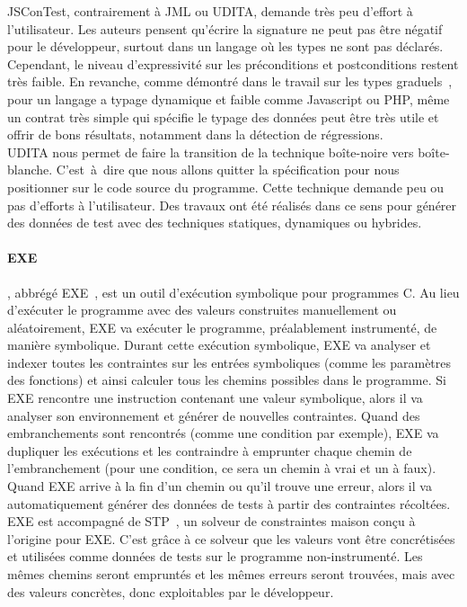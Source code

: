 JSConTest, contrairement à JML ou UDITA, demande très peu d'effort à
l'utilisateur. Les auteurs pensent qu'écrire la signature ne peut pas être
négatif pour le développeur, surtout dans un langage où les types ne sont pas
déclarés. Cependant, le niveau d'expressivité sur les préconditions et
postconditions restent très faible. En revanche, comme démontré dans le travail
sur les types graduels~, pour un langage a typage dynamique et
faible comme Javascript ou PHP, même un contrat très simple qui spécifie le
typage des données peut être très utile et offrir de bons résultats, notamment
dans la détection de régressions. \\

UDITA nous permet de faire la transition de la technique boîte-noire vers
boîte-blanche. C'est~à~dire que nous allons quitter la spécification pour nous
positionner sur le code source du programme. Cette technique demande peu ou pas
d'efforts à l'utilisateur. Des travaux ont été réalisés dans ce sens pour
générer des données de test avec des techniques statiques, dynamiques ou
hybrides.

\paragraph{EXE} , abbrégé
EXE~, est un outil d'exécution symbolique pour
programmes C.  Au lieu d'exécuter le programme avec des valeurs construites
manuellement ou aléatoirement, EXE va exécuter le programme, préalablement
instrumenté, de manière symbolique. Durant cette exécution symbolique, EXE va
analyser et indexer toutes les contraintes sur les entrées symboliques (comme
les paramètres des fonctions) et ainsi calculer tous les chemins possibles dans
le programme.  Si EXE rencontre une instruction contenant une valeur symbolique,
alors il va analyser son environnement et générer de nouvelles contraintes.
Quand des embranchements sont rencontrés (comme une condition par exemple), EXE
va dupliquer les exécutions et les contraindre à emprunter chaque chemin de
l'embranchement (pour une condition, ce sera un chemin à vrai et un à faux).
Quand EXE arrive à la fin d'un chemin ou qu'il trouve une erreur, alors il va
automatiquement générer des données de tests à partir des contraintes récoltées.
EXE est accompagné de STP~, un solveur de constraintes maison
conçu à l'origine pour EXE. C'est grâce à ce solveur que les valeurs vont être
concrétisées et utilisées comme données de tests sur le programme
non-instrumenté. Les mêmes chemins seront empruntés et les mêmes erreurs seront
trouvées, mais avec des valeurs concrètes, donc exploitables par le développeur.

